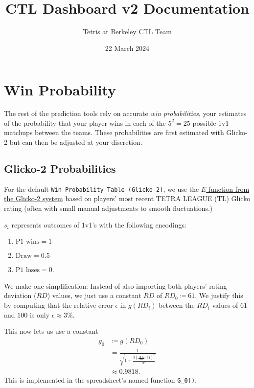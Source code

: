 \documentclass[12pt]{article}
\title{CTL Dashboard v2 Documentation}
\author{Tetris at Berkeley CTL Team}
\date{22 March 2024}
\begin{document}
	\maketitle
	\tableofcontents
	\newpage

	\section{Win Probability}
		The rest of the prediction tools rely on accurate \textit{win probabilities}, your estimates of the probability that your player wins in each of the $5^2 = 25$ possible 1v1 matchups between the teams. These probabilities are first estimated with Glicko-2 but can then be adjusted at your discretion.

		\subsection{Glicko-2 Probabilities}
			For the default \texttt{Win Probability Table (Glicko-2)}, we use the \href{https://en.wikipedia.org/wiki/Glicko_rating_system#Step_2:_Determine_new_rating}{$E$ function from the Glicko-2 system} based on players' most recent TETRA LEAGUE (TL) Glicko rating (often with small manual adjustments to smooth fluctuations.) 

			$s_i$ represents outcomes of 1v1's with the following encodings:
			\begin{enumerate}
				\item $\text{P1 wins} = 1$
				\item $\text{Draw} = 0.5$
				\item $\text{P1 loses} = 0$.
			\end{enumerate}

			We make one simplification: Instead of also importing both players' rating deviation ($RD$) values, we just use a constant $RD$ of $RD_0 \coloneqq 61$. We justify this by computing that the relative error $\epsilon$ in $g(RD_i)$ between the $RD_i$ values of $61$ and $100$ is only $\epsilon \approx 3\%$.

			This now lets us use a constant
			\begin{align*}
				g_0 &\coloneqq g(RD_0) \\
				&= \frac{1}{\sqrt{1 + \frac{3\left(\frac{\ln 10}{400} \cdot 61\right)^2}{\pi^2}}} \\
				&\approx 0.9818.
			\end{align*}
			This is implemented in the spreadsheet's named function \texttt{G\_0()}.
\end{document}
